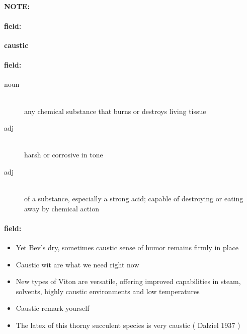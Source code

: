 \documentclass[12pt]{article}
\newenvironment{note}{\paragraph{NOTE:}}{}
\newenvironment{field}{\paragraph{field:}}{}
\begin{document}
\begin{note}
\begin{field}
\textbf{\large caustic}
\end{field}


\begin{field}
\begin{description}
\item[noun] \hfill \\ 
any chemical substance that burns or destroys living tissue

\item[adj] \hfill \\ 
harsh or corrosive in tone

\item[adj] \hfill \\ 
of a substance, especially a strong acid; capable of destroying or eating away by chemical action

\end{description}
\end{field}

\begin{field}
\begin{itemize}
\item Yet Bev's dry, sometimes caustic sense of humor remains firmly in place
\item Caustic wit are what we need right now
\item New types of Viton are versatile, offering improved capabilities in steam, solvents, highly caustic environments and low temperatures
\item Caustic remark yourself
\item The latex of this thorny succulent species is very caustic ( Dalziel 1937 )
\end{itemize}
\end{field}
\end{note}
\end{document}
